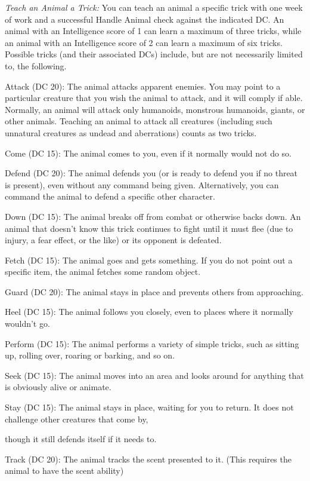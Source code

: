 \documentclass{article}
\begin{document}
\textit{Teach an Animal a Trick: }You can teach an animal a specific trick with 
one week of work and a successful Handle Animal check against the indicated DC. 
An animal with an Intelligence score of 1 can learn a maximum of three tricks, 
while an animal with an Intelligence score of 2 can learn a maximum of six tricks. 
Possible tricks (and their associated DCs) include, but are not necessarily limited 
to, the following.

Attack (DC 20): The animal attacks apparent enemies. You may point to a particular 
creature that you wish the animal to attack, and it will comply if able. Normally, 
an animal will attack only humanoids, monstrous humanoids, giants, or other animals. 
Teaching an animal to attack all creatures (including such unnatural creatures 
as undead and aberrations) counts as two tricks.

Come (DC 15): The animal comes to you, even if it normally would not do so.

Defend (DC 20): The animal defends you (or is ready to defend you if no threat 
is present), even without any command being given. Alternatively, you can command 
the animal to defend a specific other character.

Down (DC 15): The animal breaks off from combat or otherwise backs down. An animal 
that doesn't know this trick continues to fight until it must flee (due to injury, 
a fear effect, or the like) or its opponent is defeated.

Fetch (DC 15): The animal goes and gets something. If you do not point out a specific 
item, the animal fetches some random object.

Guard (DC 20): The animal stays in place and prevents others from approaching.

Heel (DC 15): The animal follows you closely, even to places where it normally 
wouldn't go.

Perform (DC 15): The animal performs a variety of simple tricks, such as sitting 
up, rolling over, roaring or barking, and so on.

Seek (DC 15): The animal moves into an area and looks around for anything that 
is obviously alive or animate.

Stay (DC 15): The animal stays in place, waiting for you to return. It does not 
challenge other creatures that come by,

though it still defends itself if it needs to.

Track (DC 20): The animal tracks the scent presented to it. (This requires the 
animal to have the scent ability)
\end{document}
